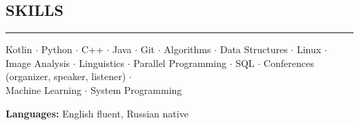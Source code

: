 \documentclass[11pt]{res} %
\let\orighref\href
\renewcommand{\href}[2]{\orighref{#1}{#2\,\faExternalLink}}
\begin{document}
\begin{resume}
\section{\uppercase{Skills}}
\begin{spacing}{0.3}
\textcolor[RGB]{220,220,220}{\rule{\linewidth}{0.4pt}} 
\end{spacing}
Kotlin $\cdot$ Python $\cdot$ C++ $\cdot$ Java $\cdot$ Git $\cdot$ Algorithms $\cdot$ Data Structures $\cdot$ Linux $\cdot$ Image Analysis $\cdot$ Linguistics $\cdot$ Parallel Programming $\cdot$ SQL $\cdot$ Conferences (organizer, speaker, listener) $\cdot$ \\Machine Learning $\cdot$ System Programming


\textbf{Languages:} English fluent, Russian native

\end{resume}
\end{document}
